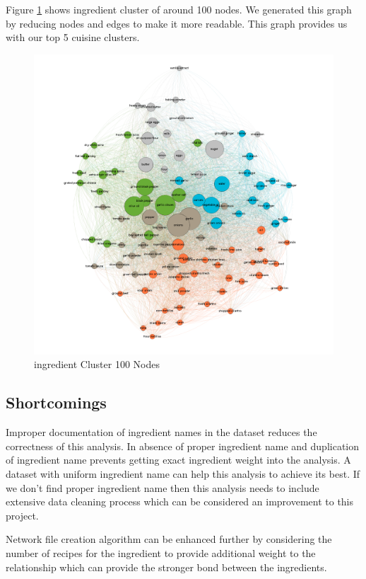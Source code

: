 \documentclass[sigconf]{acmart}
\begin{document}
Figure \ref{f:ingredient_modularity100} shows ingredient cluster of around 100 nodes. We generated this graph by reducing nodes and edges to make it more readable. This graph provides us with our top 5 cuisine clusters. 
\begin{figure}[!ht]
  \centering\includegraphics[width=\columnwidth]{images/ingredient_modularity100.png}
  \caption{ingredient Cluster 100 Nodes }\label{f:ingredient_modularity100}
\end{figure}

\subsection{Shortcomings}
Improper documentation of ingredient names in the dataset reduces the correctness of this analysis. In absence of proper ingredient name and duplication of ingredient name prevents getting exact ingredient weight into the analysis. A dataset with uniform ingredient name can help this analysis to achieve its best. If we don't find proper ingredient name then this analysis needs to include extensive data cleaning process which can be considered an improvement to this project.

Network file creation algorithm can be enhanced further by considering the number of recipes for the ingredient to provide additional weight to the relationship which can provide the stronger bond between the ingredients. 
\end{document}

